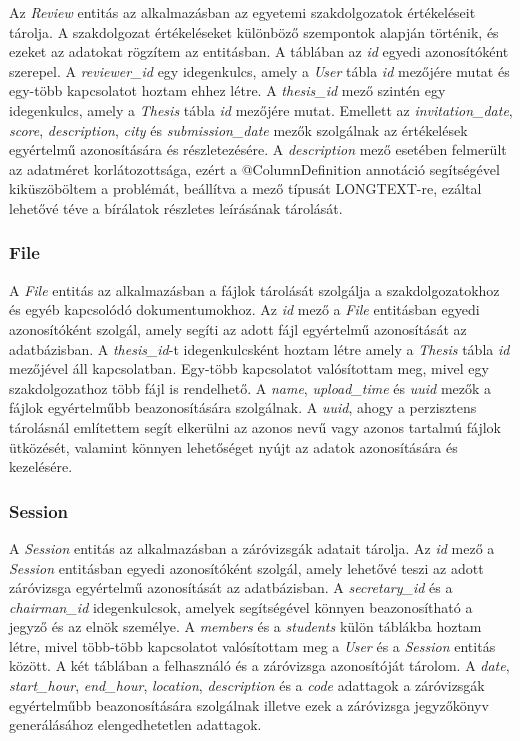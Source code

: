 Az \textit{Review} entitás az alkalmazásban az egyetemi szakdolgozatok értékeléseit tárolja. A szakdolgozat értékeléseket különböző szempontok alapján történik, és ezeket az adatokat rögzítem az entitásban. A táblában az \textit{id} egyedi azonosítóként szerepel. A \textit{reviewer\_id} egy idegenkulcs, amely a \textit{User} tábla \textit{id} mezőjére mutat és egy-több kapcsolatot hoztam ehhez létre. A \textit{thesis\_id} mező szintén egy idegenkulcs, amely a \textit{Thesis} tábla \textit{id} mezőjére mutat. Emellett az \textit{invitation\_date}, \textit{score}, \textit{description}, \textit{city} és \textit{submission\_date} mezők szolgálnak az értékelések egyértelmű azonosítására és részletezésére. A \textit{description} mező esetében felmerült az adatméret korlátozottsága, ezért a @ColumnDefinition annotáció segítségével kiküszöböltem a problémát, beállítva a mező típusát LONGTEXT-re, ezáltal lehetővé téve a bírálatok részletes leírásának tárolását.

\subsubsection{File}

A \textit{File} entitás az alkalmazásban a fájlok tárolását szolgálja a szakdolgozatokhoz és egyéb kapcsolódó dokumentumokhoz. Az \textit{id} mező a \textit{File} entitásban egyedi azonosítóként szolgál, amely segíti az adott fájl egyértelmű azonosítását az adatbázisban. A \textit{thesis\_id}-t idegenkulcsként hoztam létre amely a \textit{Thesis} tábla \textit{id} mezőjével áll kapcsolatban. Egy-több kapcsolatot valósítottam meg, mivel egy szakdolgozathoz több fájl is rendelhető. A \textit{name}, \textit{upload\_time} és \textit{uuid} mezők a fájlok egyértelműbb beazonosítására szolgálnak. A \textit{uuid}, ahogy a perzisztens tárolásnál említettem segít elkerülni az azonos nevű vagy azonos tartalmú fájlok ütközését, valamint könnyen lehetőséget nyújt az adatok azonosítására és kezelésére.

\subsubsection{Session}

A \textit{Session} entitás az alkalmazásban a záróvizsgák adatait tárolja. Az \textit{id} mező a \textit{Session} entitásban egyedi azonosítóként szolgál, amely lehetővé teszi az adott záróvizsga egyértelmű azonosítását az adatbázisban. A \textit{secretary\_id} és a \textit{chairman\_id} idegenkulcsok, amelyek segítségével könnyen beazonosítható a jegyző és az elnök személye. A \textit{members} és a \textit{students} külön táblákba hoztam létre, mivel több-több kapcsolatot valósítottam meg a \textit{User} és a \textit{Session} entitás között. A két táblában a felhasználó és a záróvizsga azonosítóját tárolom. A \textit{date}, \textit{start\_hour}, \textit{end\_hour}, \textit{location}, \textit{description} és a \textit{code} adattagok a záróvizsgák egyértelműbb beazonosítására szolgálnak illetve ezek a záróvizsga jegyzőkönyv generálásához elengedhetetlen adattagok.

